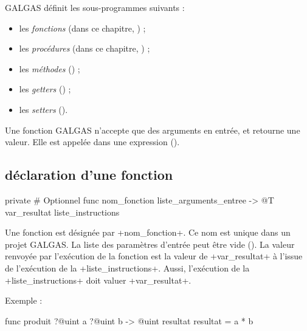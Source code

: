 

GALGAS définit les sous-programmes suivants :
\begin{itemize}
  \item les \emph{fonctions} (dans ce chapitre, ) ;
  \item les \emph{procédures} (dans ce chapitre, ) ;
  \item les \emph{méthodes} () ;
  \item les \emph{getters} () ;
  \item les \emph{setters} ().
\end{itemize}


Une fonction GALGAS n'accepte que des arguments en entrée, et retourne une valeur. Elle est appelée dans une expression ().

\subsection{déclaration d'une fonction}

\begin{galgascode}
private # Optionnel
func nom_fonction liste_arguments_entree -> @T var_resultat {
  liste_instructions
}
\end{galgascode}

Une fonction est désignée par \ggs+nom_fonction+. Ce nom est unique dans un projet GALGAS. La liste des paramètres d'entrée peut être vide (). La valeur renvoyée par l'exécution de la fonction est la valeur de \ggs+var_resultat+ à l'issue de l'exécution de la \ggs+liste_instructions+. Aussi, l'exécution de la \ggs+liste_instructions+ doit valuer \ggs+var_resultat+.

Exemple :

\begin{galgascode}
func produit ?@uint a ?@uint b -> @uint resultat {
  resultat = a * b
}
\end{galgascode}



